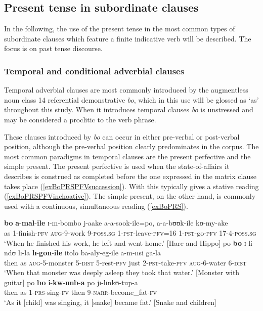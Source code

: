 \subsection{Present tense in subordinate clauses}\label{PRSsubordinate}
In the following, the use of the present tense in the most common types of subordinate clauses which feature a finite indicative verb will be described. The focus is on past tense discourse.

\subsubsection{Temporal and conditional adverbial clauses}\label{TemporalConditionalClauses}
Temporal adverbial clauses are most commonly introduced by the augmentless noun class 14 referential demonstrative \textit{bo}, which in this use will be glossed as \lq as' throughout this study. When it introduces temporal clauses \textit{bo} is unstressed and may be considered a proclitic to the verb phrase.

These clauses introduced by \textit{bo} can occur in either pre-verbal or post-verbal position, although the pre-verbal position clearly predominates in the corpus. The most common paradigms in temporal clauses are the present perfective and the simple present. The present perfective is used when the state-of-affairs it describes is construed as completed before the one expressed in the matrix clause takes place (\ref{exBoPRSPFVsuccession}). With  this typically gives a stative reading (\ref{exBoPRSPFVinchoative}). The simple present, on the other hand, is commonly used with a continuous, simultaneous reading (\ref{exBoPRS}).
\begin{exe}
\ex \label{exBoPRSPFVsuccession}
\gll \textbf{bo} \textbf{a}-\textbf{mal}-\textbf{ile} ɪ-m-bombo j-aake a-a-sook-ile=po, a-a-bʊʊk-ile kʊ-my-ake\\
as 1-finish-\textsc{pfv} \textsc{aug}-9-work 9-\textsc{poss.sg} 1-\textsc{pst}-leave-\textsc{pfv}=16 1-\textsc{pst}-go-\textsc{pfv} 17-4-\textsc{poss.sg}\\
\glt \lq When he finished his work, he left and went home.' [Hare and Hippo]
\ex \label{exBoPRSPFVinchoative}
\gll po \textbf{bo} ɪ-li-ndʊ lɪ-la \textbf{lɪ}-\textbf{gon}-\textbf{ile} itolo ba-aly-eg-ile a-m-ɪɪsi ga-la\\
then as \textsc{aug}-5-monster 5-\textsc{dist} 5-rest-\textsc{pfv} just 2-\textsc{pst}-take-\textsc{pfv} \textsc{aug}-6-water 6-\textsc{dist}\\
\glt \lq When that monster was deeply asleep they took that water.' [Monster with guitar]
\ex \label{exBoPRS}
\gll po \textbf{bo} \textbf{i}-\textbf{kw}-\textbf{ɪmb}-\textbf{a} po jɪ-lɪnkʊ-tup-a\\
then as 1-\textsc{prs}-sing-\textsc{fv} then 9-\textsc{narr}-become\_fat-\textsc{fv}\\
\glt \lq As it [child] was singing, it [snake] became fat.' [Snake and children]
\end{exe}

